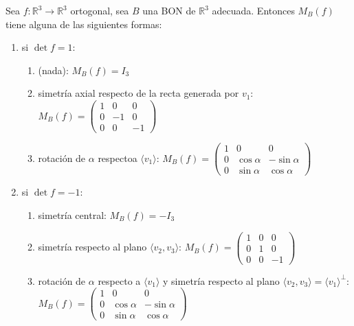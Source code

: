 \documentclass[14pt]{book}
\begin{document}
\begin{tm}
	Sea $f: \mathbb{R}^3 \to \mathbb{R}^3$ ortogonal, sea $B$ una BON de $\mathbb{R}^3$ adecuada. Entonces $M_B(f)$ tiene alguna de las siguientes formas:
	\begin{enumerate}
		\item si $\det f = 1$:
		\begin{enumerate}
			\item (nada): $M_B(f) = I_3$
			\item simetría axial respecto de la recta generada por $v_1$: $M_B(f) = \left(\begin{array}{ccc}
			1 & 0 & 0 \\ 0 & -1 & 0 \\ 0 & 0 & -1
			\end{array}\right)$
			\item rotación de $\alpha$ respectoa  $\langle v_1 \rangle$: $M_B(f) =  \left(\begin{array}{ccc}
			1 & 0 & 0 \\ 0 & \cos \alpha & -\sin \alpha \\ 0 & \sin \alpha & \cos \alpha
			\end{array}\right)$
		\end{enumerate}
		\item si $\det f = -1$:
		\begin{enumerate}
			\item simetría central: $M_B(f) = -I_3$
			\item simetría respecto al plano $\langle v_2, v_3 \rangle$: $M_B(f) = \left(\begin{array}{ccc}
			1 & 0 & 0 \\ 0 & 1 & 0 \\ 0 & 0 & -1
			\end{array}\right)$
			\item rotación de $\alpha$ respecto a  $\langle v_1 \rangle$ y simetría respecto al plano $\langle v_2, v_3 \rangle = \langle v_1 \rangle ^\perp$: $M_B(f) =  \left(\begin{array}{ccc}
			1 & 0 & 0 \\ 0 & \cos \alpha & -\sin \alpha \\ 0 & \sin \alpha & \cos \alpha
			\end{array}\right)$
		\end{enumerate}
	\end{enumerate}
\end{tm}
\end{document}
